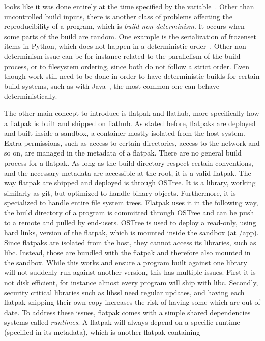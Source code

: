 \documentclass[a4paper,11pt,oneside]{report}
\theoremstyle{definition}
\newcommand{\fp}{flatpak\xspace}
\newcommand{\Fp}{Flatpak\xspace}
\newcommand{\fh}{flathub\xspace}
\newcommand{\ot}{OSTree\xspace}
\begin{document}
looks like it was done entirely at the time specified by the
variable~\cite{rb:sde}.
Other than uncontrolled build inputs, there is another class of problems
affecting the reproducibility of a program, which is \emph{build
non-determinism}. It occurs when some parts of the build are random. One
example is the serialization of frozenset items in Python, which does not
happen in a deterministic order~\cite{gh:pyc-frozenset}. Other non-determinism
issue can be for instance related to the parallelism of the build process, or
to filesystem ordering, since both do not follow a strict order. Even though
work still need to be done in order to have deterministic builds for certain
build systems, such as with Java~\cite{xiong2022towards}, the most common one
can behave deterministically.


The other main concept to introduce is \fp and \fh, more specifically how a \fp
is built and shipped on \fh. As stated before, flatpaks are deployed and built
inside a sandbox, a container mostly isolated from the host system. Extra
permissions, such as access to certain directories, access to the network and
so on, are managed in the metadata of a \fp. There are no general build process
for a \fp. As long as the build directory respect certain conventions, and the
necessary metadata are accessible at the root, it is a valid \fp. The way \fp
are shipped and deployed is through \ot. It is a library, working similarly as
git, but optimized to handle binary objects. Furthermore, it is specialized to
handle entire file system trees. \Fp uses it in the following way, the build
directory of a program is committed through \ot and can be push to a remote and
pulled by end-users. \ot is used to deploy a read-only, using hard links,
version of the \fp, which is mounted inside the sandbox (at /app). Since
flatpaks are isolated from the host, they cannot access its libraries, such as
libc. Instead, those are bundled with the \fp and therefore also mounted in the
sandbox. While this works and ensure a program built against one library will
not suddenly run against another version, this has multiple issues. First it is
not disk efficient, for instance almost every program will ship with libc.
Secondly, security critical libraries such as libssl need regular updates, and
having each \fp shipping their own copy increases the risk of having some which
are out of date. To address these issues, \fp comes with a simple shared
dependencies systems called \emph{runtimes}. A \fp will always depend on a
specific runtime (specified in its metadata), which is another \fp containing
\end{document}
